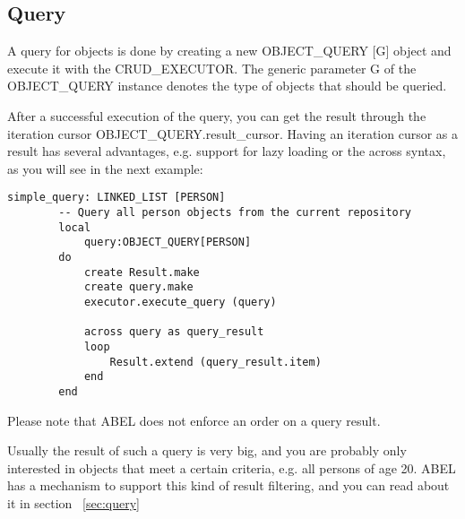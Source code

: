 \subsection{Query}

A query for objects is done by creating a new OBJECT\_QUERY [G] object and execute it with the CRUD\_EXECUTOR.
The generic parameter G of the OBJECT\_QUERY instance denotes the type of objects that should be queried.

After a successful execution of the query, you can get the result through the iteration cursor OBJECT\_QUERY.result\_cursor.
Having an iteration cursor as a result has several advantages, e.g. support for lazy loading or the across syntax, as you will see in the next example:

\begin{lstlisting}[language=OOSC2Eiffel, captionpos=b, caption={}, label={lst:simple_query}]
	simple_query: LINKED_LIST [PERSON]
		-- Query all person objects from the current repository
		local
			query:OBJECT_QUERY[PERSON]
		do
			create Result.make
			create query.make
			executor.execute_query (query)

			across query as	query_result
			loop
				Result.extend (query_result.item)
			end
		end
\end{lstlisting}

Please note that ABEL does not enforce an order on a query result.

Usually the result of such a query is very big, and you are probably only interested in objects that meet a certain criteria, e.g. all persons of age 20.
ABEL has a mechanism to support this kind of result filtering, and you can read about it in section ~\ref{sec:query}

\begin{comment}
ABEL can also filter the query results in advance so you only get a result set that meets certain criteria: 

\begin{lstlisting}[language=OOSC2Eiffel, captionpos=b, caption={}, label={lst:simple_filtered_query}]
	simple_filtered_query (name:STRING; age:INTEGER): detachable PERSON
		-- Query a person object from the current repository
		local
			query:PS_OBJECT_QUERY[PERSON]
			criterion:PS_PREDEFINED_CRITERION
		do
			create query.make
			create criterion.make ("last_name", "=", name)
			query.set_criterion (criterion)

			from
				executor.execute_query (query)
			until 
				query.result_cursor.after
			loop
				if query.result_cursor.item.age = age then 
					Result:= query.result_cursor.item
				end
			end
		end
\end{lstlisting}

This is just a very simple example for a query with a certain criterion.
ABEL has a powerful mechanism that also supports a logical combinations of multiple criteria, or using agents for filtering.
You can read more about criteria in section XY.

\end{comment}


